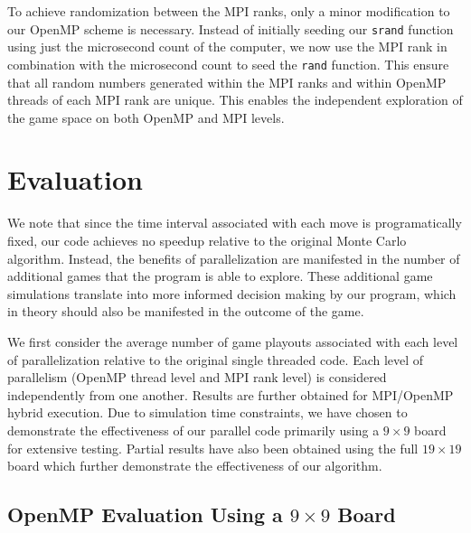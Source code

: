 \documentclass[nocopyrightspace, 10pt]{sigplanconf}
\begin{document}
To achieve randomization between the MPI ranks, only a minor modification to our OpenMP scheme is necessary.  Instead of initially seeding our \texttt{srand} function using just the microsecond count of the computer, we now use the MPI rank in combination with the microsecond count to seed the \texttt{rand} function.  This ensure that all random numbers generated within the MPI ranks and within OpenMP threads of each MPI rank are unique.  This enables the independent exploration of the game space on both OpenMP and MPI levels.


\section{Evaluation}

We note that since the time interval associated with each move is programatically fixed, our code achieves no speedup relative to the original Monte Carlo algorithm.  Instead, the benefits of parallelization are manifested in the number of additional games that the program is able to explore.  These additional game simulations translate into more informed decision making by our program, which in theory should also be manifested in the outcome of the game.

We first consider the average number of game playouts associated with each level of parallelization relative to the original single threaded code.  Each level of parallelism (OpenMP thread level and MPI rank level) is considered independently from one another.  Results are further obtained for  MPI/OpenMP hybrid execution.  Due to simulation time constraints, we have chosen to demonstrate the effectiveness of our parallel code primarily using a $9 \times 9$ board for extensive testing.  Partial results have also been obtained using the full $19 \times 19$ board which further demonstrate the effectiveness of our algorithm.


\subsection{OpenMP Evaluation Using a $9 \times 9$ Board}


%  
%  
\end{document}
